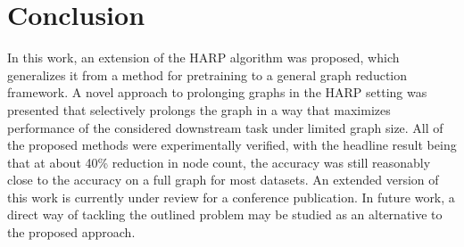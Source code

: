 \section{Conclusion}

In this work, an extension of the HARP algorithm was proposed, which generalizes it from a method for pretraining to a general graph reduction framework. A novel approach to prolonging graphs in the HARP setting was presented that selectively prolongs the graph in a way that maximizes performance of the considered downstream task under limited graph size. All of the proposed methods were experimentally verified, with the headline result being that at about 40\% reduction in node count, the accuracy was still reasonably close to the accuracy on a full graph for most datasets. An extended version of this work is currently under review for a conference publication. In future work, a direct way of tackling the outlined problem may be studied as an alternative to the proposed approach.
